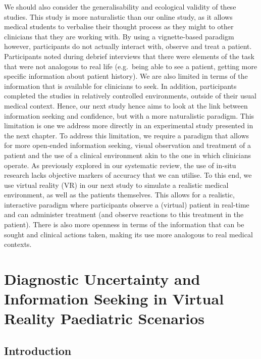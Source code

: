 \documentclass[a4paper, nobind]{templates/ociamthesis}
\begin{document}
We should also consider the generalisability and ecological validity of these studies. This study is more naturalistic than our online study, as it allows medical students to verbalise their thought process as they might to other clinicians that they are working with. By using a vignette-based paradigm however, participants do not actually interact with, observe and treat a patient. Participants noted during debrief interviews that there were elements of the task that were not analogous to real life (e.g.~being able to see a patient, getting more specific information about patient history). We are also limited in terms of the information that is available for clinicians to seek. In addition, participants completed the studies in relatively controlled environments, outside of their usual medical context. Hence, our next study hence aims to look at the link between information seeking and confidence, but with a more naturalistic paradigm. This limitation is one we address more directly in an experimental study presented in the next chapter. To address this limitation, we require a paradigm that allows for more open-ended information seeking, visual observation and treatment of a patient and the use of a clinical environment akin to the one in which clinicians operate. As previously explored in our systematic review, the use of in-situ research lacks objective markers of accuracy that we can utilise. To this end, we use virtual reality (VR) in our next study to simulate a realistic medical environment, as well as the patients themselves. This allows for a realistic, interactive paradigm where participants observe a (virtual) patient in real-time and can administer treatment (and observe reactions to this treatment in the patient). There is also more openness in terms of the information that can be sought and clinical actions taken, making its use more analogous to real medical contexts.

\chapter{Diagnostic Uncertainty and Information Seeking in Virtual Reality Paediatric Scenarios}\label{chapter-5}

\adjustmtc
{}

\section{Introduction}\label{introduction-3}
\end{document}
